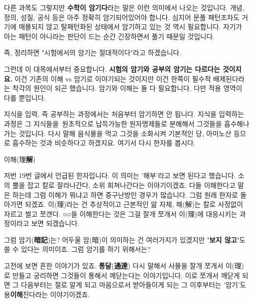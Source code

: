 다른 과목도 그렇지만 \textbf{수학이 암기다}라는 말은 이런 의미에서 나오는 것입니다.
개념, 정의, 성질, 공식 등은 아주 정확히 암기되어있어야 합니다.
심지어 문풀 패턴조차도 거기에 매몰되지 않고 탈패턴화된 상태에서 암기하고 있는 것 역시 필요합니다.
자기가 아는 패턴이 아니라는 판단이 드는 순간 긴장하면서 풀기 때문일 것입니다.
\vspace{5mm}

즉, 정리하면 "시험에서의 암기는 절대적이다"라고 하겠습니다.
\vspace{5mm}

그런데 이 대목에서부터 중요합니다.
\textbf{시험의 암기와 공부의 암기는 다르다는 것이지요.}
이건 기존의 이해 vs 암기로 이야기되는 것이지만 이건 한쪽이 필수적 배제된다라는 착각의 원인이 되곤 했습니다.
암기와 이해는 둘 다 필요합니다. 다만 적용 영역이 다를 뿐입니다.
\vspace{5mm}

지식을 입력, 즉 공부하는 과정에서는 처음부터 암기하면 안 됩니다.
지식을 입력하는 과정은 그 지식들을 원초적으로 납득가능한 원자명제들로 분해해서 그것들을 흡수해나가는 것입니다.
다시 말해 음식물을 먹고 그것을 소화시켜 기본적인 당, 아미노산 등으로 흡수하는 것과 비슷하다고 하겠지요.
여기서 다시 한자를 봅시다.
\vspace{5mm}

이해(理\textbf{解})
\vspace{5mm}

저번 19번 글에서 언급된 한자입니다. 이 의미는 '해부'라고 보면 된다고 했습니다.
소의 뿔을 잡고 칼로 잘라나간다, 소위 회쳐나간다는 이야기이겠죠.
다들 이해한다고 말은 하는데 그럼 이해가 뭐냐고 하면 중구난방인 경우가 많습니다.
그럼 원래 한자로 돌아가면 되겠죠.
이(理)라는 건 추상적이고 근본적인 앎 자체, 해(解)는 칼로 사정없이 자르고 썰고 쪼갠다.
○○을 이해한다는 것은 그걸 잘개 쪼개서 이(理)에 대응시키는 과정이라고 보면 되겠습니다.
\vspace{5mm}

그럼 암기(\textbf{暗記})는?
어두울 암(暗)이 의미하는 건 여러가지가 있겠지만 \textbf{'보지 않고'}도 쓸 수 있다는 의미이죠.
그럼 암기를 하기 위해서는?
\vspace{5mm}

고전에 보면 흔한 이야기가 있죠. \textbf{통달}(\textbf{通達})
다시 말해서 사물을 잘개 쪼개서 이(理)로 만들고 궁리하면 그것들이 통해서 깨닫는다는 이야기입니다.
이로 쪼개서 깨닫게 되면 그 다음부터는 절로 알게 되고 마음으로서 받아들이게 되는 그 이후부터는 '암기'도 용\textbf{이해}진다라는 이야기이겠죠.
\vspace{5mm}


